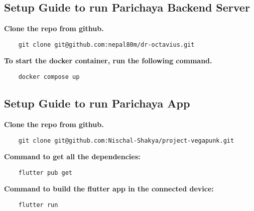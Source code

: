 \tocless\subsection{Setup Guide to run Parichaya Backend Server} 
\vspace{15pt}
\textbf{Clone the repo from github.}
\begin{verbatim}
    git clone git@github.com:nepal80m/dr-octavius.git
\end{verbatim}
\textbf{To start the docker container, run the following command.}
\begin{verbatim}
    docker compose up
\end{verbatim}

\tocless\subsection{Setup Guide to run Parichaya App} 
\vspace{15pt}
\textbf{Clone the repo from github.}
\begin{verbatim}
    git clone git@github.com:Nischal-Shakya/project-vegapunk.git
\end{verbatim}

\textbf{Command to get all the dependencies:}
\begin{verbatim}
    flutter pub get
\end{verbatim}

\textbf{Command to build the flutter app in the connected device:}
\begin{verbatim}
    flutter run
\end{verbatim}

 \newpage


